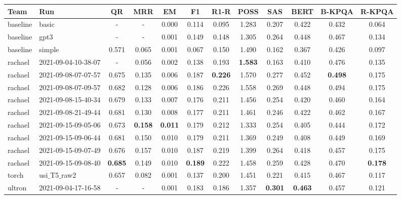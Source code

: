 \begin{tabular}{@{}lp{10.8em}CCCCCCCCCC@{}}
\toprule
\bf Team & \bf Run             & \bf QR    & \bf MRR   & \bf EM    & \bf F1    & \bf R1-R  & \bf POSS  & \bf SAS   & \bf BERT  & \bf B-KPQA & \bf R-KPQA \\
\midrule                                                                                                                                        
baseline & basic               & -         & -         & 0.000     & 0.114     & 0.095     & 1.283     & 0.207     & 0.422     & 0.432      & 0.064      \\
baseline & gpt3                & -         & -         & 0.001     & 0.149     & 0.148     & 1.305     & 0.264     & 0.448     & 0.467      & 0.134      \\
baseline & simple              & 0.571     & 0.065     & 0.001     & 0.067     & 0.150     & 1.490     & 0.162     & 0.367     & 0.426      & 0.097      \\
\addlinespace[2pt]
rachael  & 2021-09-04-10-38-07 & -         & 0.056     & 0.002     & 0.138     & 0.193     & \bf 1.583 & 0.163     & 0.410     & 0.476      & 0.135      \\
rachael  & 2021-09-08-07-07-57 & 0.675     & 0.135     & 0.006     & 0.187     & \bf 0.226 & 1.570     & 0.277     & 0.452     & \bf 0.498  & 0.175      \\
rachael  & 2021-09-08-07-09-57 & 0.682     & 0.128     & 0.006     & 0.186     & 0.226     & 1.558     & 0.269     & 0.448     & 0.494      & 0.175      \\
rachael  & 2021-09-08-15-40-34 & 0.679     & 0.133     & 0.007     & 0.176     & 0.211     & 1.456     & 0.254     & 0.420     & 0.460      & 0.164      \\
rachael  & 2021-09-08-21-49-44 & 0.681     & 0.130     & 0.008     & 0.177     & 0.211     & 1.461     & 0.246     & 0.422     & 0.462      & 0.167      \\
rachael  & 2021-09-15-09-05-06 & 0.673     & \bf 0.158 & \bf 0.011 & 0.179     & 0.212     & 1.333     & 0.254     & 0.405     & 0.444      & 0.172      \\
rachael  & 2021-09-15-09-06-44 & 0.681     & 0.150     & 0.010     & 0.179     & 0.211     & 1.369     & 0.249     & 0.408     & 0.449      & 0.169      \\
rachael  & 2021-09-15-09-07-49 & 0.676     & 0.157     & 0.010     & 0.187     & 0.219     & 1.399     & 0.264     & 0.418     & 0.457      & 0.175      \\
rachael  & 2021-09-15-09-08-40 & \bf 0.685 & 0.149     & 0.010     & \bf 0.189 & 0.222     & 1.458     & 0.259     & 0.428     & 0.470      & \bf 0.178  \\
\addlinespace[2pt]
torch    & usi$\_$T5$\_$raw2   & 0.657     & 0.082     & 0.001     & 0.137     & 0.200     & 1.451     & 0.221     & 0.415     & 0.467      & 0.117      \\
\addlinespace[2pt]
ultron   & 2021-09-04-17-16-58 & -         & -         & 0.001     & 0.183     & 0.186     & 1.357     & \bf 0.301 & \bf 0.463 & 0.457      & 0.121      \\
\bottomrule
\end{tabular}
